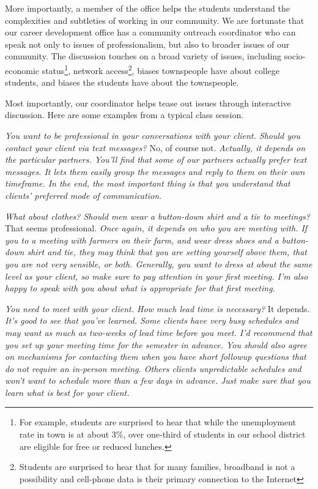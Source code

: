 More importantly, a member of the office helps the students understand
the complexities and subtleties of working in our community.  We
are fortunate that our career development office has a community
outreach coordinator who can speak not only to issues of professionalism,
but also to broader issues of our community.  The discussion touches
on a broad variety of issues, including socio-economic status\footnote{For
example, students are surprised to hear that while the unemployment
rate in town is at about 3\%, over one-third of students in our
school district are eligible for free or reduced lunches.}, network
access\footnote{Students are surprised to hear that for many families,
broadband is not a possibility and cell-phone data is their primary
connection to the Internet}, biases townspeople have about college
students, and biases the students have about the townspeople.

Most importantly, our coordinator helps tease out issues through interactive
discussion.  Here are some examples from a typical class session.

\newcommand{\question}[1]{\textsl{#1}}
\newcommand{\answer}[1]{#1}
\newcommand{\followup}[1]{\textsl{#1}}

\question{You want to be professional in your conversations with your client.  Should you contact your client via text messages?}
\answer{No, of course not.}
\followup{Actually, it depends on the particular partners.  You'll find that some of our partners actually prefer text messages.  It lets them easily group the messages and reply to them on their own timeframe.  In the end, the most important thing is that you understand that clients' preferred mode of communication.}

\question{What about clothes?  Should men wear a button-down shirt and a tie to meetings?}
\answer{That seems professional.}
\followup{Once again, it depends on who you are meeting with.  If
you to a meeting with farmers on their farm, and wear dress shoes
and a button-down shirt and tie, they may think that you are setting
yourself above them, that you are not very sensible, or both.
Generally, you want to dress at about the same level as your client,
so make sure to pay attention in your first meeting.  I'm also happy
to speak with you about what is appropriate for that first meeting.}

\question{You need to meet with your client.  How much lead time is necessary?}
\answer{It depends.}
\followup{It's good to see that you've learned.  Some clients have very
busy schedules and may want as much as two-weeks of lead time before
you meet.  I'd recommend that you set up your meeting time for the
semester in advance.  You should also agree on mechanisms for
contacting them when you have short followup questions that do not
require an in-person meeting.  Others clients unpredictable schedules
and won't want to schedule more than a few days in advance.  Just make
sure that you learn what is best for your client.}

